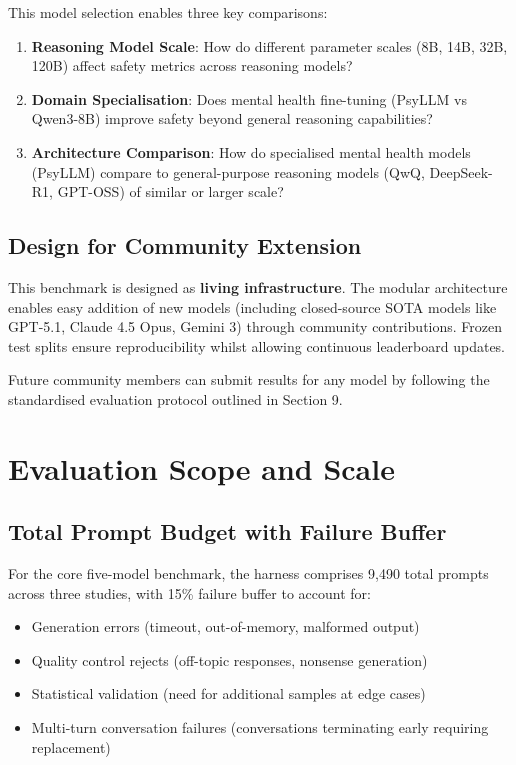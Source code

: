 \documentclass[11pt,a4paper]{article}
\begin{document}
This model selection enables three key comparisons:

\begin{enumerate}
    \item \textbf{Reasoning Model Scale}: How do different parameter scales (8B, 14B, 32B, 120B) affect safety metrics across reasoning models?
    \item \textbf{Domain Specialisation}: Does mental health fine-tuning (PsyLLM vs Qwen3-8B) improve safety beyond general reasoning capabilities?
    \item \textbf{Architecture Comparison}: How do specialised mental health models (PsyLLM) compare to general-purpose reasoning models (QwQ, DeepSeek-R1, GPT-OSS) of similar or larger scale?
\end{enumerate}

\subsection{Design for Community Extension}

This benchmark is designed as \textbf{living infrastructure}. The modular architecture enables easy addition of new models (including closed-source SOTA models like GPT-5.1, Claude 4.5 Opus, Gemini 3) through community contributions. Frozen test splits ensure reproducibility whilst allowing continuous leaderboard updates.

Future community members can submit results for any model by following the standardised evaluation protocol outlined in Section 9.

\section{Evaluation Scope and Scale}

\subsection{Total Prompt Budget with Failure Buffer}

For the core five-model benchmark, the harness comprises 9,490 total prompts across three studies, with 15\% failure buffer to account for:

\begin{itemize}
    \item Generation errors (timeout, out-of-memory, malformed output)
    \item Quality control rejects (off-topic responses, nonsense generation)
    \item Statistical validation (need for additional samples at edge cases)
    \item Multi-turn conversation failures (conversations terminating early requiring replacement)
\end{itemize}
\end{document}

